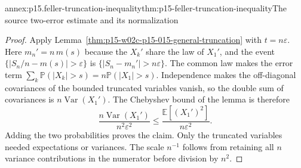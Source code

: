 \begin{annexitem}{annex:p15.feller-truncation-inequality}{thm:p15-feller-truncation-inequality}{The source two-error estimate and its normalization}
\begin{proof}
Apply Lemma~\ref{thm:p15-w02c-p15-015-general-truncation} with
\(t=n\varepsilon\). Here \(m_n'=n\,m(s)\) because the \(X_k'\) share
the law of \(X_1'\), and the event
\(\{|S_n/n-m(s)|>\varepsilon\}\) is \(\{|S_n-m_n'|>n\varepsilon\}\).
The common law makes the error term
\(\sum_k\mathbb P(|X_k|>s)=n\mathbb P(|X_1|>s)\).
Independence makes the off-diagonal covariances of the bounded
truncated variables vanish, so the double sum of covariances is
\(n\operatorname{Var}(X_1')\).
The Chebyshev bound of the lemma is therefore
\[
 \frac{n\operatorname{Var}(X_1')}{n^2\varepsilon^2}
       \leq\frac{\mathbb E[(X_1')^2]}{n\varepsilon^2}.
\]
Adding the two probabilities proves the claim.
Only the truncated variables needed expectations or variances.
The scale \(n^{-1}\) follows from retaining all \(n\) variance
contributions in the numerator before division by \(n^2\).
\end{proof}
\end{annexitem}

